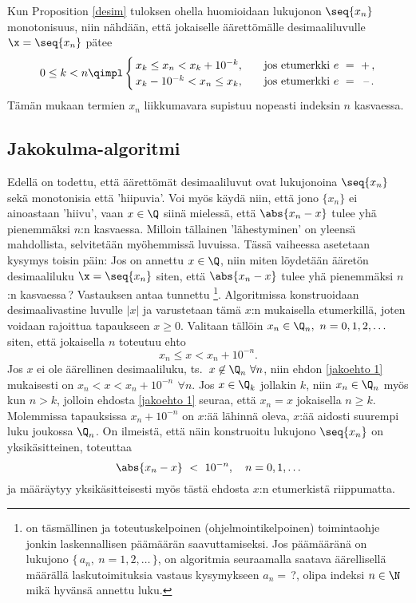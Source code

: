 Kun Proposition \ref{desim} tuloksen ohella huomioidaan lukujonon $\seq{x_n}$ monotonisuus, niin
nähdään, että jokaiselle äärettömälle desimaaliluvulle $\x=\seq{x_n}$ pätee
\[
0 \le k < n \qimpl \begin{cases} 
                   \,x_k \le x_n < x_k + 10^{-k}, \quad &\text{jos etumerkki $e\ =\ +$}\,, \\
                   \,x_k - 10^{-k} < x_n \le x_k, \quad &\text{jos etumerkki $e\ =\,\ $ --}\,.
                   \end{cases}
\]
Tämän mukaan termien $x_n$ liikkumavara supistuu nopeasti indeksin $n$ kasvaessa.

\subsection*{Jakokulma-algoritmi}
%

Edellä on todettu, että äärettömät desimaaliluvut ovat lukujonoina $\seq{x_n}$ sekä monotonisia
että 'hiipuvia'. Voi myös käydä niin, että jono $\{x_n\}$ ei ainoastaan 'hiivu', vaan 
 $x \in \Q$ siinä mielessä, että $\abs{x_n-x}$ tulee yhä 
pienemmäksi $n$:n kasvaessa. Milloin tällainen 'lähestyminen' on yleensä mahdollista, 
selvitetään myöhemmissä luvuissa. Tässä vaiheessa asetetaan kysymys toisin päin: Jos on annettu
$x\in\Q$, niin miten löydetään ääretön desimaaliluku $\x=\seq{x_n}$ siten, että $\abs{x_n-x}$ 
tulee yhä pienemmäksi $n$:n kasvaessa\,? Vastauksen antaa tunnettu 
\footnote[2]{ on täsmällinen ja toteutuskelpoinen
(ohjelmointikelpoinen) toimintaohje jonkin laskennallisen päämäärän saavuttamiseksi. Jos 
päämääränä on lukujono $\{\,a_n,\ n=1,2, \ldots\,\}$, on algoritmia seuraamalla saatava 
äärellisellä määrällä laskutoimituksia vastaus kysymykseen $a_n=\,$?, olipa indeksi $n \in \N$
mikä hyvänsä annettu luku. }. Algoritmissa konstruoidaan desimaalivastine
luvulle $|x|$ ja varustetaan tämä $x$:n mukaisella etumerkillä, joten voidaan rajoittua
tapaukseen $x \ge 0$. Valitaan tällöin $x_n\in\Q_n,\ n=0,1,2,\ldots$ siten, että jokaisella
$n$ toteutuu ehto
\begin{equation} \label{jakoehto 1}
x_n \le x < x_n + 10^{-n}.
\end{equation}
Jos $x$ ei ole äärellinen desimaaliluku, ts.\ $x\not\in\Q_n\ \forall n$, niin ehdon
\eqref{jakoehto 1} mukaisesti on $x_n < x < x_n+10^{-n}\,\ \forall n$. Jos $x\in\Q_k$
jollakin $k$, niin $x_n\in\Q_n$ myös kun $n>k$, jolloin ehdosta \eqref{jakoehto 1}
seuraa, että $x_n=x$ jokaisella $n \ge k$. Molemmissa tapauksissa $x_n+10^{-n}$ on $x$:ää
lähinnä oleva, $x$:ää aidosti suurempi luku joukossa $\Q_n$. On ilmeistä, että näin
konstruoitu lukujono $\seq{x_n}$ on yksikäsitteinen, toteuttaa
\begin{equation}  \label{jakoehto 2}
\abs{x_n - x}\ <\ 10^{-n}, \quad n=0,1, \ldots
\end{equation}
ja määräytyy yksikäsitteisesti myös tästä ehdosta $x$:n etumerkistä riippumatta.


